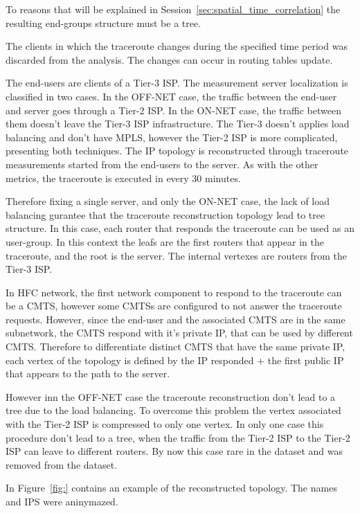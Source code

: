 To reasons that will be explained in
Session~\ref{sec:spatial_time_correlation} the resulting end-groups structure
must be a tree.

The clients in which the traceroute changes during the specified time period
was discarded from the analysis. The changes can occur in routing tables
update.

The end-users are clients of a Tier-3 ISP\@. The measurement server localization
is classified in two cases. In the OFF-NET case, the traffic between the
end-user and server goes through a Tier-2 ISP\@. In the ON-NET case, the traffic
between them doesn't leave the Tier-3 ISP infrastructure. The Tier-3 doesn't
applies load balancing and don't have MPLS, however the Tier-2 ISP is more
complicated, presenting both techniques. The IP topology is reconstructed
through traceroute measurements started from the end-users to the server. As
with the other metrics, the traceroute is executed in every 30 minutes.

Therefore fixing a single server, and only the ON-NET case, the lack of load
balancing gurantee that the traceroute
reconstruction topology lead to tree structure. In this case, each router that
responds the traceroute can be used as an user-group. In this context the leafs
are the first routers that appear in the traceroute, and the root is the
server. The internal vertexes are routers from the Tier-3 ISP\@.

In HFC network, the first network component to respond to the traceroute can be
a CMTS, however some CMTSs are configured to not answer the traceroute
requests. However,
since the end-user and the associated CMTS are in the same subnetwork, the CMTS
respond with it's private IP, that can be used by different CMTS\@. Therefore to
differentiate distinct CMTS that have the same private IP, each vertex of the
topology is defined by the IP responded + the first public IP that appears to
the path to the server.

However inn the OFF-NET case the traceroute reconstruction don't lead to a
tree due to the load balancing. To overcome this problem the vertex associated
with the Tier-2 ISP is compressed to only one vertex. In only one case this
procedure don't lead to a tree, when the traffic from the Tier-2 ISP to the
Tier-2 ISP can leave to different routers. By now this case rare in the dataset
and was removed from the dataset.

In Figure~\ref{fig:} contains an example of the reconstructed
topology. The names and IPS were aninymazed.

